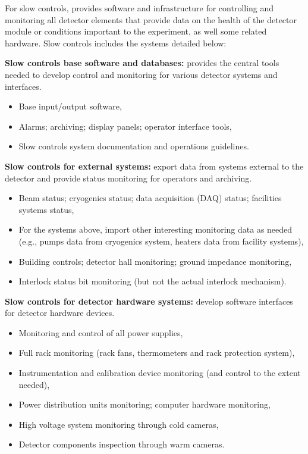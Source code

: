 For slow controls,  provides software and infrastructure for controlling and monitoring all detector elements that provide data on the health of the detector module or conditions important to the experiment, as well some related hardware. Slow controls includes the systems detailed below:

\textbf{Slow controls base software and databases:} provides the central tools needed to develop
control and monitoring for various detector systems and interfaces.
\begin{itemize}
\item Base input/output software,
\item Alarms; archiving; display panels; operator interface tools,
\item Slow controls system documentation and operations guidelines.
\end{itemize}
%
\textbf{Slow controls for external systems:} export data from systems external to the detector and provide status monitoring for operators and archiving.
\begin{itemize}
\item Beam status; cryogenics status; data acquisition (DAQ) status; facilities systems status,
\item For the systems above, import other interesting monitoring data as needed (e.g., pumps
data from cryogenics system, heaters data from facility systems), 
\item Building controls; detector hall monitoring; ground impedance monitoring,
\item Interlock status bit monitoring (but not the actual interlock mechanism).
\end{itemize}
%
\textbf{Slow controls for detector hardware systems:} develop software interfaces for detector hardware devices.
\begin{itemize}
\item Monitoring and control of all power supplies,
\item Full rack monitoring (rack fans, thermometers and rack protection system),
\item Instrumentation and calibration device monitoring (and control to the extent needed),
\item Power distribution units monitoring; computer hardware monitoring,
\item High voltage system monitoring through cold cameras,
\item Detector components inspection through warm cameras.
\end{itemize}
